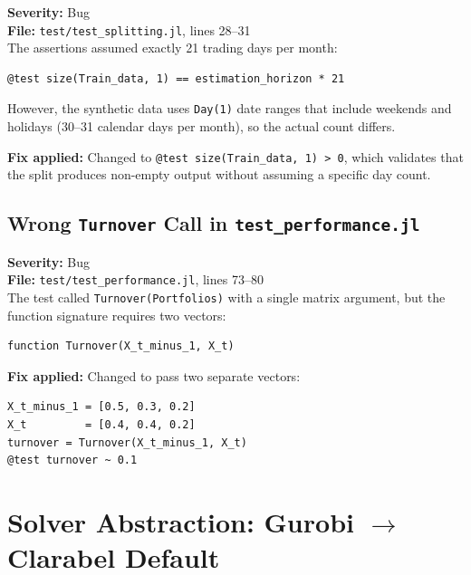 \documentclass[11pt,a4paper]{article}
\begin{document}
\textbf{Severity:} Bug\\
\textbf{File:} \texttt{test/test\_splitting.jl}, lines 28--31\\[0.3em]
The assertions assumed exactly 21 trading days per month:

\begin{lstlisting}
@test size(Train_data, 1) == estimation_horizon * 21
\end{lstlisting}

However, the synthetic data uses \texttt{Day(1)} date ranges that include weekends
and holidays (30--31 calendar days per month), so the actual count differs.

\textbf{Fix applied:} Changed to \texttt{@test size(Train\_data, 1) > 0}, which
validates that the split produces non-empty output without assuming a specific day
count.

\subsection{Wrong \texttt{Turnover} Call in \texttt{test\_performance.jl}}
\label{sec:turnover-test}

\textbf{Severity:} Bug\\
\textbf{File:} \texttt{test/test\_performance.jl}, lines 73--80\\[0.3em]
The test called \texttt{Turnover(Portfolios)} with a single matrix argument, but
the function signature requires two vectors:

\begin{lstlisting}
function Turnover(X_t_minus_1, X_t)
\end{lstlisting}

\textbf{Fix applied:} Changed to pass two separate vectors:

\begin{lstlisting}
X_t_minus_1 = [0.5, 0.3, 0.2]
X_t         = [0.4, 0.4, 0.2]
turnover = Turnover(X_t_minus_1, X_t)
@test turnover ~ 0.1
\end{lstlisting}

\section{Solver Abstraction: Gurobi $\to$ Clarabel Default}
\label{sec:solver}
\end{document}
